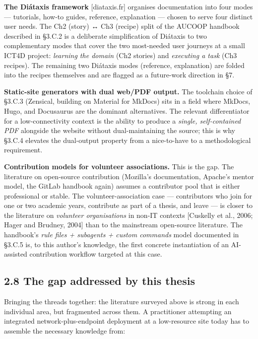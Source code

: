 \textbf{The Diátaxis framework} {[}diataxis.fr{]} organises
documentation into four modes --- tutorials, how-to guides, reference,
explanation --- chosen to serve four distinct user needs. The Ch2
(story) ↔ Ch3 (recipe) split of the AUCOOP handbook described in §3.C.2
is a deliberate simplification of Diátaxis to two complementary modes
that cover the two most-needed user journeys at a small ICT4D project:
\emph{learning the domain} (Ch2 stories) and \emph{executing a task}
(Ch3 recipes). The remaining two Diátaxis modes (reference, explanation)
are folded into the recipes themselves and are flagged as a future-work
direction in §7.

\textbf{Static-site generators with dual web/PDF output.} The toolchain
choice of §3.C.3 (Zensical, building on Material for MkDocs) sits in a
field where MkDocs, Hugo, and Docusaurus are the dominant alternatives.
The relevant differentiator for a low-connectivity context is the
ability to produce a \emph{single, self-contained PDF} alongside the
website without dual-maintaining the source; this is why §3.C.4 elevates
the dual-output property from a nice-to-have to a methodological
requirement.

\textbf{Contribution models for volunteer associations.} This is the
gap. The literature on open-source contribution (Mozilla's
documentation, Apache's mentor model, the GitLab handbook again) assumes
a contributor pool that is either professional or stable. The
volunteer-association case --- contributors who join for one or two
academic years, contribute as part of a thesis, and leave --- is closer
to the literature on \emph{volunteer organisations} in non-IT contexts
{[}Cuskelly et al., 2006; Hager and Brudney, 2004{]} than to the
mainstream open-source literature. The handbook's \emph{rule files +
subagents + custom commands} model documented in §3.C.5 is, to this
author's knowledge, the first concrete instantiation of an AI-assisted
contribution workflow targeted at this case.

\hypertarget{the-gap-addressed-by-this-thesis}{%
\subsection{2.8 The gap addressed by this
thesis}\label{the-gap-addressed-by-this-thesis}}

Bringing the threads together: the literature surveyed above is strong
in each individual area, but fragmented across them. A practitioner
attempting an integrated network-plus-endpoint deployment at a
low-resource site today has to assemble the necessary knowledge from:

